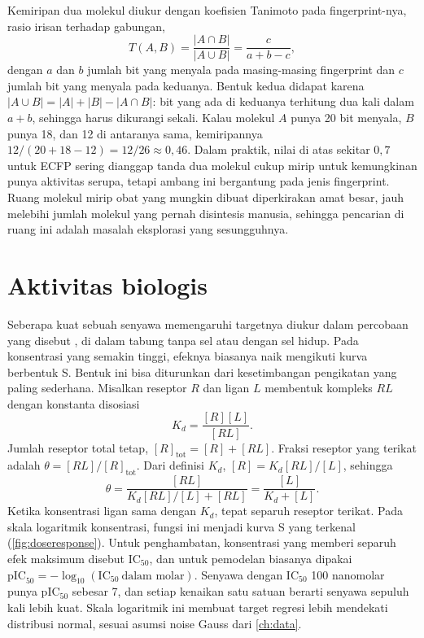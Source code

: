 Kemiripan dua molekul diukur dengan koefisien Tanimoto pada fingerprint-nya, rasio irisan terhadap gabungan,
\begin{equation}
T(A,B)=\frac{|A\cap B|}{|A\cup B|}=\frac{c}{a+b-c},
\end{equation}
dengan $a$ dan $b$ jumlah bit yang menyala pada masing-masing fingerprint dan $c$ jumlah bit yang menyala pada keduanya.
Bentuk kedua didapat karena $|A\cup B|=|A|+|B|-|A\cap B|$: bit yang ada di keduanya terhitung dua kali dalam $a+b$,
sehingga harus dikurangi sekali. Kalau molekul $A$ punya 20 bit menyala, $B$ punya 18, dan 12 di antaranya sama,
kemiripannya $12/(20+18-12)=12/26\approx0{,}46$. Dalam praktik, nilai di atas sekitar $0{,}7$ untuk ECFP sering dianggap
tanda dua molekul cukup mirip untuk kemungkinan punya aktivitas serupa, tetapi ambang ini bergantung pada jenis
fingerprint. Ruang molekul mirip obat yang mungkin dibuat diperkirakan amat besar, jauh melebihi jumlah molekul yang
pernah disintesis manusia, sehingga pencarian di ruang ini adalah masalah eksplorasi yang sesungguhnya.

\section{Aktivitas biologis}

Seberapa kuat sebuah senyawa memengaruhi targetnya diukur dalam percobaan yang disebut , di dalam tabung
tanpa sel atau dengan sel hidup. Pada konsentrasi yang semakin tinggi, efeknya biasanya naik mengikuti kurva berbentuk S.
Bentuk ini bisa diturunkan dari kesetimbangan pengikatan yang paling sederhana. Misalkan reseptor $R$ dan ligan $L$
membentuk kompleks $RL$ dengan konstanta disosiasi
\begin{equation}
K_d=\frac{[R][L]}{[RL]}.
\end{equation}
Jumlah reseptor total tetap, $[R]_{\mathrm{tot}}=[R]+[RL]$. Fraksi reseptor yang terikat adalah $\theta=[RL]/[R]_{\mathrm{tot}}$.
Dari definisi $K_d$, $[R]=K_d[RL]/[L]$, sehingga
\begin{equation}
\theta=\frac{[RL]}{K_d[RL]/[L]+[RL]}=\frac{[L]}{K_d+[L]}.
\end{equation}
Ketika konsentrasi ligan sama dengan $K_d$, tepat separuh reseptor terikat. Pada skala logaritmik konsentrasi, fungsi ini
menjadi kurva S yang terkenal (\cref{fig:doseresponse}). Untuk penghambatan, konsentrasi yang memberi separuh efek
maksimum disebut IC$_{50}$, dan untuk pemodelan biasanya dipakai $\mathrm{pIC}_{50}=-\log_{10}(\mathrm{IC}_{50}\ \text{dalam molar})$.
Senyawa dengan IC$_{50}$ 100 nanomolar punya pIC$_{50}$ sebesar 7, dan setiap kenaikan satu satuan berarti senyawa sepuluh
kali lebih kuat. Skala logaritmik ini membuat target regresi lebih mendekati distribusi normal, sesuai asumsi noise Gauss
dari \cref{ch:data}.

